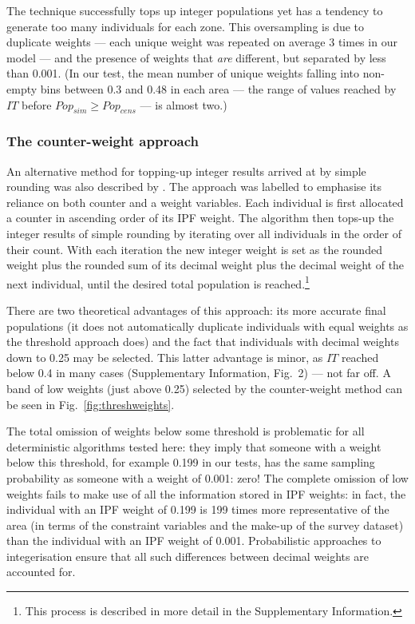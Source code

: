 \documentclass[a4paper, 11pt, twoside]{Thesis}
\begin{document}
The technique successfully tops up integer populations yet has
a tendency to generate too many individuals for each zone.
This oversampling is due to duplicate weights --- each unique weight was
repeated on average 3 times in our model --- and the presence of
weights that \emph{are} different, but separated by less than 0.001.
(In our test, the mean number of unique weights falling into
non-empty bins between 0.3 and 0.48 in each area --- the range of values
reached by $IT$ before  $Pop_{sim} \geq Pop_{cens}$ --- is almost two.)


\subsubsection{The counter-weight approach}
An alternative method for topping-up integer results arrived at by simple
rounding was also described by \citet{Ballas2005c}. The approach was labelled
to emphasise its reliance on both counter and a weight variables. Each
individual is first allocated a counter in ascending order of its IPF weight.
The algorithm then tops-up the integer results of simple rounding by iterating
over all individuals in the order of their count. With each iteration the new
integer weight is set as the rounded weight plus the rounded sum of its decimal
weight plus the decimal weight of the next individual, until the desired total
population is reached.\footnote{This process is described in more detail in the
Supplementary Information.} 

There are two theoretical advantages of this approach: its more accurate
final populations (it does not automatically duplicate individuals with equal
weights as the threshold approach does) and the fact that
individuals with decimal weights down to 0.25 may be selected.
This latter advantage is minor, as $IT$ reached below 0.4 in many cases
(Supplementary Information, Fig.~2) --- not far off.
A band of low weights (just above 0.25)
selected by the counter-weight method can be seen in
Fig.~\ref{fig:threshweights}.

The total omission of weights below some threshold is problematic for all
deterministic algorithms tested here: they imply that someone with a weight
below this threshold, for example 0.199 in our tests, has the same sampling
probability as someone with a weight of 0.001: zero! The complete
omission of low weights fails to make use of all the information stored in
IPF weights: in fact, the individual with an
IPF weight of 0.199 is 199 times more representative of the area (in terms of
the constraint variables and the make-up of the survey dataset) than the
individual with an IPF weight of 0.001. Probabilistic approaches to
integerisation ensure that all such differences between decimal weights
are accounted for.
\end{document}
